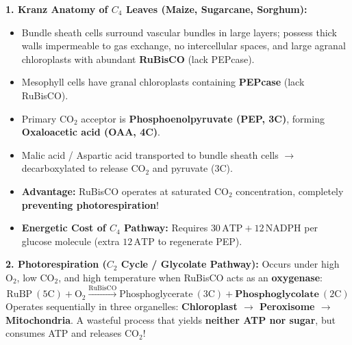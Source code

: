\documentclass[10pt,a4paper]{article}
\begin{document}
\begin{conceptbox}
\textbf{1. Kranz Anatomy of $C_4$ Leaves (Maize, Sugarcane, Sorghum):}
\begin{itemize}
  \item Bundle sheath cells surround vascular bundles in large layers; possess thick walls impermeable to gas exchange, no intercellular spaces, and large agranal chloroplasts with abundant \textbf{RuBisCO} (lack PEPcase).
  \item Mesophyll cells have granal chloroplasts containing \textbf{PEPcase} (lack RuBisCO).
  \item Primary $\mathrm{CO}_2$ acceptor is \textbf{Phosphoenolpyruvate (PEP, 3C)}, forming \textbf{Oxaloacetic acid (OAA, 4C)}.
  \item Malic acid / Aspartic acid transported to bundle sheath cells $\to$ decarboxylated to release $\mathrm{CO}_2$ and pyruvate (3C).
  \item \textbf{Advantage:} RuBisCO operates at saturated $\mathrm{CO}_2$ concentration, completely \textbf{preventing photorespiration}!
  \item \textbf{Energetic Cost of $C_4$ Pathway:} Requires \textbf{$30\,\mathrm{ATP} + 12\,\mathrm{NADPH}$} per glucose molecule (extra $12\,\mathrm{ATP}$ to regenerate PEP).
\end{itemize}
\textbf{2. Photorespiration ($C_2$ Cycle / Glycolate Pathway):}
Occurs under high $\mathrm{O}_2$, low $\mathrm{CO}_2$, and high temperature when RuBisCO acts as an \textbf{oxygenase}:
\begin{equation}
  \mathrm{RuBP}\ (5\mathrm{C}) + \mathrm{O_2} \xrightarrow{\mathrm{RuBisCO}} \text{Phosphoglycerate}\ (3\mathrm{C}) + \mathbf{Phosphoglycolate}\ (2\mathrm{C})
\end{equation}
Operates sequentially in three organelles: \textbf{Chloroplast $\to$ Peroxisome $\to$ Mitochondria}. A wasteful process that yields \textbf{neither ATP nor sugar}, but consumes ATP and releases $\mathrm{CO}_2$!
\end{conceptbox}
\end{document}
